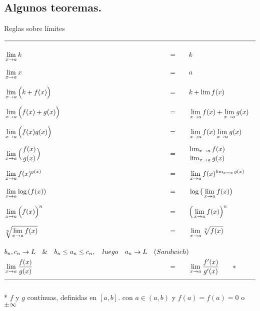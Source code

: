 \documentclass[12pt,a4paper]{extarticle}
\begin{document}
\subsection{Algunos teoremas.}
\begin{table}[!htbp]
\caption{Reglas sobre l\'imites}
\begin{align*}
\hline \\
& \lim_{x \to a}k & = \qquad & k &\\[0.7em]
& \lim_{x \to a}x & = \qquad & a &\\[0.7em]
& \lim_{x \to a}\Big(k + f(x)\Big) & =  \qquad & k + \lim f(x)& \\[0.7em]
& \lim_{x \to a}\Big(f(x) + g(x)\Big) & =   \qquad  &   \lim_{x \to a}f(x) + \lim_{x  \to a} g(x)&  \\[0.7em]
& \lim_{x \to a}\Big(f(x) g(x)\Big) & =   \qquad  &   \lim_{x \to a}f(x) \lim_{x  \to a} g(x)&  \\[0.7em]
& \lim_{x \to a}\Big(\frac{f(x)}{g(x)}\Big) & =   \qquad  &\frac{\lim_{x \to a}f(x) }{\lim_{x  \to a} g(x)} &  \\[0.7em]
& \lim_{x \to a}f(x)^{g(x)} & =   \qquad  & \lim_{x \to
  a}f(x)^{\lim_{x \to a}g(x)} &\\[0.7em]
& \lim_{x \to a} \log{(f(x))} & =   \qquad  & \log{\big(\lim_{x \to a} f(x)\big)} &\\[0.7em]
& \lim_{x \to a}\Big(f(x)\Big)^n & = \qquad & \Big(\lim_{x \to  a}f(x)\Big)^n & \\[0.7em]
& \sqrt[n]{\lim_{x \to a}f(x)} & = \qquad & \lim_{x \to
  a}\sqrt[n]{f(x)} & \\[1.1em]
& b_n, c_n \to L \quad \& \quad b_n \leq a_n \leq c_n ,\quad  luego
                          \quad a_n \to L & (Sandwich)\\
& \lim_{x \to a}\frac{f(x)}{g(x)} & = \qquad & \lim_{x \to
  a}\frac{f'(x)}{g'(x)} \qquad * & \\[0.7em]
\hline\\
\end{align*}
* \( f\) y \( g \) cont\'inuas, definidas en \( [a,b]\).
 con \( a \in (a,b) \) y \( f(a) = f(a) = 0 \) o \( \pm \infty\)\\
\label{tab:limReg}
\end{table}
\end{document}
